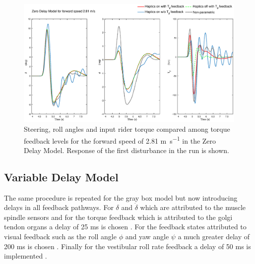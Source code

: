 \begin{figure}[!h]
    \centering
    \captionsetup{justification=centering,margin=2cm}

    \includegraphics[width=\textwidth]{images/fb_compare_plots/no_delay_fb_compare28.eps}
    \caption{Steering, roll angles and input rider torque compared among torque feedback levels  for the forward speed of 2.81 \si{\meter\per\second} in the Zero Delay Model. Response of the first disturbance in the run is shown.}
    \label{fig:paper6}
\end{figure}



\subsection{Variable Delay Model}
The same procedure is repeated for the gray box model but now introducing  delays in all feedback pathways. For \ensuremath{\delta} and \ensuremath{\dot{\delta}} which are attributed to the muscle spindle sensors and for the torque feedback which is attributed to the golgi tendon organs  a delay of 25 \si{\milli\second} is chosen \cite{van2002identification,de2002adaptation}. For the feedback states attributed to visual feedback such as the roll angle \ensuremath{\phi} and yaw angle \ensuremath{\psi} a much greater delay of 200 \si{\milli\second} is chosen \cite{kawakami2002visual}. Finally for  the vestibular roll rate feedback a delay of 50 \si{\milli\second} is implemented \cite{barnett2013vestibular}. 

